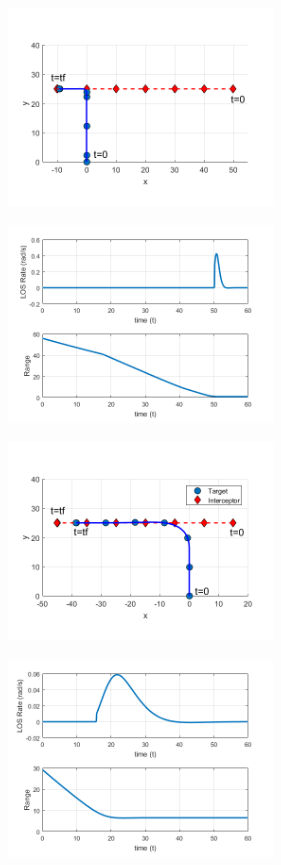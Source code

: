 \documentclass[conference]{IEEEtran}
\begin{document}
\begin{figure}[H]
	\centering
	\includegraphics[width=7cm] {ptx50}
	\caption{}
	\label{}
	\hspace*{0mm}
\end{figure}
\begin{figure}[H]
	\centering
	\includegraphics[width=7cm] {ptx50_range_LOSrate}
	\caption{}
	\label{}
	\hspace*{0mm}
\end{figure}
\begin{figure}[H]
	\centering
	\includegraphics[width=7cm] {ptx15}
	\caption{}
	\label{}
	\hspace*{0mm}
\end{figure}
\begin{figure}[H]
	\centering
	\includegraphics[width=7cm] {ptx15_range_LOSrate}
	\caption{}
	\label{}
	\hspace*{0mm}
\end{figure}
\end{document}
